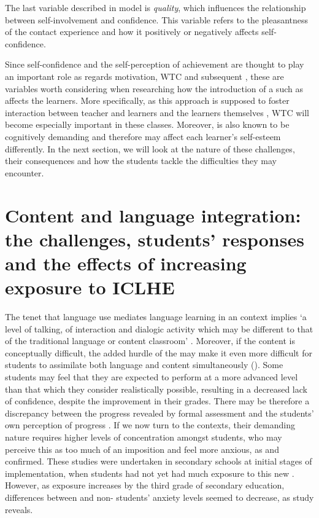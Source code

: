 \documentclass[output=paper]{langsci/langscibook}
\begin{document}
The last variable described in  model is \textit{quality}, which influences the relationship between self-involvement and  confidence. This variable refers to the pleasantness of the contact experience and how it positively or negatively affects self-confidence. 



Since  self-confidence and the self-perception of  achievement are thought to play an important role as regards motivation, WTC and subsequent , these are variables worth considering when researching how the introduction of a  such as  affects the learners. More specifically, as this approach is supposed to foster interaction between teacher and learners and the learners themselves \citep{Coyle2007},  WTC will become especially important in these classes.  Moreover,  is also known to be cognitively demanding \citep{CoyleEtAl2009} and therefore may affect each learner’s self-esteem differently. In the next section, we will look at the nature of these challenges, their consequences and how the students tackle the difficulties they may encounter. 


\section{Content and language integration: the challenges, students’ responses and the effects of increasing exposure to ICLHE} 
 

The  tenet that language use mediates language learning   \citep{Swain2000output}  in an  context implies ‘a level of talking, of interaction and dialogic activity which may be different to that of the traditional language or content classroom’ \citep[554]{Coyle2007}. Moreover, if the content is conceptually difficult, the added hurdle of the  may make it even more difficult for students to assimilate both language and content simultaneously (\citealt{Seikkula-Leino2007}). Some students may feel that they are expected to perform at a more advanced level than that which they consider realistically possible, resulting in a decreased lack of confidence, despite the improvement in their grades. There may be therefore a discrepancy between the progress revealed by formal assessment and the students’ own perception of progress \citep{Mearns2012}. If we now turn to the  contexts, their demanding nature requires higher levels of concentration amongst students, who may perceive this as too much of an imposition \citep{Hunt2011} and feel more anxious,  as  \citet{SylvénThompson2015} and \citet{SantosMenezesJuanGarau2013} confirmed.  These studies were undertaken in secondary schools at initial stages of  implementation, when students had not yet had much exposure to this new .  However, as exposure increases by the third grade of secondary education, differences between  and non- students’ anxiety levels seemed to decrease, as  study reveals.
\end{document}
